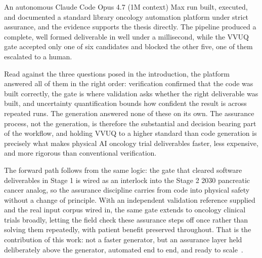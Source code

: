 
An autonomous Claude Code Opus 4.7 (1M context) Max run built, executed, and
documented a standard library oncology automation platform under strict
assurance, and the evidence supports the thesis directly. The pipeline produced a
complete, well formed deliverable in well under a millisecond, while the VVUQ
gate accepted only one of six candidates and blocked the other five, one of them
escalated to a human. 

Read against the three questions posed in the introduction,
the platform answered all of them in the right order: verification confirmed that
the code was built correctly, the gate is where validation asks whether the right
deliverable was built, and uncertainty quantification bounds how confident the
result is across repeated runs. The generation answered none of these on its own.
The assurance process, not the generation, is therefore the substantial and
decision bearing part of the workflow, and holding VVUQ to a higher standard than
code generation is precisely what makes physical AI oncology trial deliverables
faster, less expensive, and more rigorous than conventional verification.

The forward path follows from the same logic: the gate that cleared software
deliverables in Stage 1 is wired as an interlock into the Stage 2 2030 pancreatic
cancer analog, so the assurance discipline carries from code into physical safety
without a change of principle. With an independent validation reference supplied
and the real input corpus wired in, the same gate extends to oncology clinical
trials broadly, letting the field check these assurance steps off once rather
than solving them repeatedly, with patient benefit preserved throughout. That is
the contribution of this work: not a faster generator, but an assurance layer
held deliberately above the generator, automated end to end, and ready to scale~\cite{repo-cancer-automated}.
